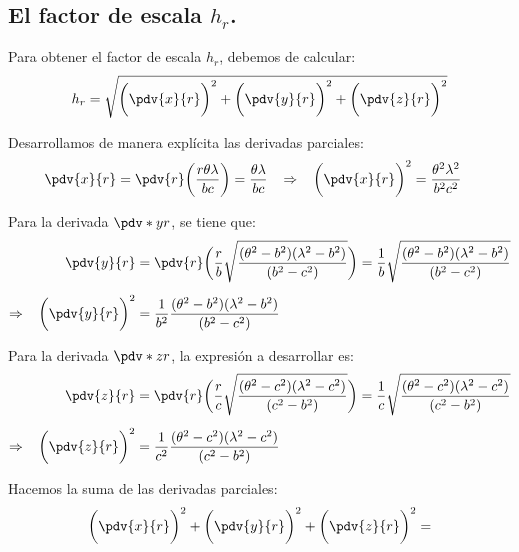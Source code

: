 \subsection*{El factor de escala \texorpdfstring{$h_{r}$}{hr}.}

Para obtener el factor de escala $h_{r}$, debemos de calcular:
\begin{align*}
h_{r} = \sqrt{\bigg( \pdv{x}{r} \bigg)^{2} + \bigg( \pdv{y}{r} \bigg)^{2} + \bigg( \pdv{z}{r} \bigg)^{2}}
\end{align*}

Desarrollamos de manera explícita las derivadas parciales:
\begin{align*}
\pdv{x}{r} &=  \displaystyle \pdv{r} \bigg( \dfrac{r \theta \lambda}{b c} \bigg) =  \dfrac{\theta \lambda}{b c} \hspace{0.3cm} \Rightarrow \hspace{0.3cm} \bigg( \pdv{x}{r} \bigg)^{2} = \dfrac{\theta^{2} \lambda^{2}}{b^{2} c^{2}}
\end{align*}

Para la derivada $\displaystyle \pdv*{y}{r}$, se tiene que:
\begin{align*}
\pdv{y}{r} &=  \pdv{r} \bigg( \dfrac{r}{b} \sqrt{\dfrac{ (\theta^{2} - b^{2}) (\lambda^{2} - b^{2}) }{(b^{2} - c^{2})}} \bigg) = \dfrac{1}{b} \sqrt{\dfrac{ (\theta^{2} - b^{2}) (\lambda^{2} - b^{2}) }{(b^{2} - c^{2})}} \\[0.5em] 
\Rightarrow \hspace{0.3cm} \bigg( \pdv{y}{r} \bigg)^{2} &= \dfrac{1}{b^{2}} \dfrac{ (\theta^{2} - b^{2}) (\lambda^{2} - b^{2})}{(b^{2} - c^{2})}
\end{align*}

Para la derivada $\displaystyle \pdv*{z}{r}$, la expresión a desarrollar es:
\begin{align*}
\pdv{z}{r} &=  \pdv{r} \bigg( \dfrac{r}{c} \sqrt{\dfrac{ (\theta^{2} - c^{2}) (\lambda^{2} - c^{2}) }{(c^{2} - b^{2})}} \bigg) = \dfrac{1}{c} \sqrt{\dfrac{ (\theta^{2} - c^{2}) (\lambda^{2} - c^{2}) }{(c^{2} - b^{2})}} \\[0.5em] 
\Rightarrow \hspace{0.3cm} \bigg( \pdv{z}{r} \bigg)^{2} &= \dfrac{1}{c^{2}} \dfrac{ (\theta^{2} - c^{2}) (\lambda^{2} - c^{2}) }{(c^{2} - b^{2})}
\end{align*}

Hacemos la suma de las derivadas parciales:
\begin{align*}
\bigg( \pdv{x}{r} \bigg)^{2} + \bigg( \pdv{y}{r} \bigg)^{2} + \bigg( \pdv{z}{r} \bigg)^{2} =
\end{align*}

